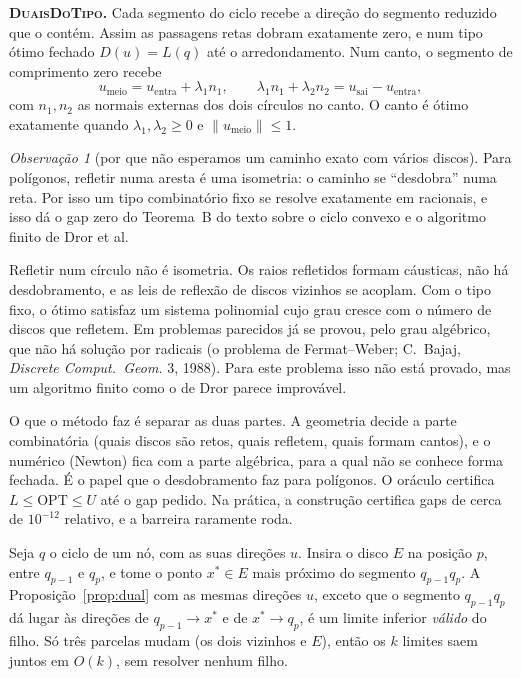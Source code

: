 \documentclass[11pt]{article}
\theoremstyle{plain}
\theoremstyle{remark}
\newtheorem*{obs}{Observação}
\newcommand{\sect}[1]{\par\bigskip{\color{navy}\large\bfseries #1\par}\smallskip}
\begin{document}
\textbf{\textsc{DuaisDoTipo}.} Cada segmento do ciclo recebe a direção do segmento reduzido
que o contém. Assim as passagens retas dobram exatamente zero, e num tipo ótimo fechado
$D(u)=L(q)$ até o arredondamento. Num canto, o segmento de comprimento zero recebe
\[
  u_{\mathrm{meio}}=u_{\mathrm{entra}}+\lambda_1n_1,\qquad
  \lambda_1n_1+\lambda_2n_2=u_{\mathrm{sai}}-u_{\mathrm{entra}},
\]
com $n_1,n_2$ as normais externas dos dois círculos no canto. O canto é ótimo exatamente
quando $\lambda_1,\lambda_2\ge0$ e $\lVert u_{\mathrm{meio}}\rVert\le1$.

\begin{obs}[por que não esperamos um caminho exato com vários discos]
Para polígonos, refletir numa aresta é uma isometria: o caminho se ``desdobra'' numa reta.
Por isso um tipo combinatório fixo se resolve exatamente em racionais, e isso dá o gap zero
do Teorema~B do texto sobre o ciclo convexo e o algoritmo finito de Dror et al.

Refletir num círculo não é isometria. Os raios refletidos formam cáusticas, não há
desdobramento, e as leis de reflexão de discos vizinhos se acoplam. Com o tipo fixo, o ótimo
satisfaz um sistema polinomial cujo grau cresce com o número de discos que refletem. Em
problemas parecidos já se provou, pelo grau algébrico, que não há solução por radicais (o
problema de Fermat--Weber; C.~Bajaj, \emph{Discrete Comput.\ Geom.} 3, 1988). Para este
problema isso não está provado, mas um algoritmo finito como o de Dror parece improvável.

O que o método faz é separar as duas partes. A geometria decide a parte combinatória (quais
discos são retos, quais refletem, quais formam cantos), e o numérico (Newton) fica com a
parte algébrica, para a qual não se conhece forma fechada. É o papel que o desdobramento faz para
polígonos. O oráculo certifica $L\le\mathrm{OPT}\le U$ até o gap pedido. Na prática, a
construção certifica gaps de cerca de $10^{-12}$ relativo, e a barreira raramente roda.
\end{obs}

\sect{4. Inserção de um disco: limites em forma fechada}

Seja $q$ o ciclo de um nó, com as suas direções $u$. Insira o disco $E$ na posição $p$, entre
$q_{p-1}$ e $q_p$, e tome o ponto $x^\ast\in E$ mais próximo do segmento $q_{p-1}q_p$. A
Proposição~\ref{prop:dual} com as mesmas direções $u$, exceto que o segmento $q_{p-1}q_p$
dá lugar às direções de $q_{p-1}\to x^\ast$ e de $x^\ast\to q_p$, é um limite inferior
\emph{válido} do filho. Só três parcelas mudam (os dois vizinhos e $E$), então os $k$
limites saem juntos em $O(k)$, sem resolver nenhum filho.
\end{document}
